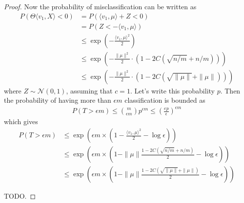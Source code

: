 \documentclass[a4paper]{article}
\newcommand*{\cN}{\mathcal{N}}
\begin{document}
\begin{proof}
  Now the probability of misclassification can be written as
  \begin{align*}
    P\left( \Theta \langle v_1, X\rangle < 0 \right)
    &= P\left( \langle v_1, \mu \rangle + Z < 0 \right)
    \\
    &= P\left( Z < -\langle v_1, \mu \rangle \right)
    \\
    &\le \exp\left( - \frac{\langle v_1, \mu \rangle^2}{2} \right)
    \\
    &\le \exp\left( - \frac{\|\mu\|^2}{2} \cdot \left( 1 - 2C (\sqrt{n/m} + n/m)\right) \right) 
    \\
    &\le \exp\left( - \frac{\|\mu\|^2}{2} \cdot \left( 1 - 2C (\sqrt{\|\mu\|} + \|\mu\|)\right) \right)
  \end{align*}
  where $Z \sim \cN(0, 1)$, assuming that $c = 1$.
  Let's write this probability $p$.
  Then the probability of having more than $\epsilon m$ classification is bounded as
  \begin{align*}
    P(T > \epsilon m) \le \binom{m}{\epsilon m} p^{\epsilon m} \le \left(\frac{ep }{\epsilon}\right)^{\epsilon m}
  \end{align*}
  which gives
  \begin{align*}
    P(T > \epsilon m) &\le \exp\left( \epsilon m \times \left( 1 - \frac{\langle v_1, \mu \rangle^2}{2} - \log \epsilon \right)\right)
    \\
    &\le \exp \left( \epsilon m \times \left( 1 - \|\mu\| \frac{1 - 2 C (\sqrt{n/m} + n/m)}{2} - \log \epsilon\right) \right)
    \\
    &\le \exp\left( \epsilon m \times \left( 1 - \|\mu\| \frac{1 - 2C(\sqrt{\|\mu\|} + \|\mu\|)}{2} - \log \epsilon\right) \right)
  \end{align*}

  TODO.
\end{proof}
\end{document}
